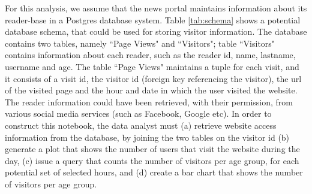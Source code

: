 For this analysis, we assume that the news portal maintains information about its reader-base in a Postgres database system. Table \ref{tab:schema} shows a potential database schema, that could be used for storing visitor information. The database contains two tables, namely ``Page Views" and ``Visitors"; table ``Visitors" contains information about each reader, such as the reader id, name, lastname, username and age. The table ``Page Views" maintains a tuple for each visit, and it consists of a visit id, the visitor id (foreign key referencing the visitor), the url of the visited page and the hour and date in which the user visited the website. The reader information could have been retrieved, with their permission, from various social media services (such as Facebook, Google etc). In order to construct this notebook, the data analyst must (a) retrieve  website access information from the database, by joining the two tables on the visitor id (b) generate a plot that shows the number of users that visit the website during the day, (c) issue a query that counts the number of visitors per age group, for each potential set of selected hours, and (d) create a bar chart that shows the number of visitors per age group. 



